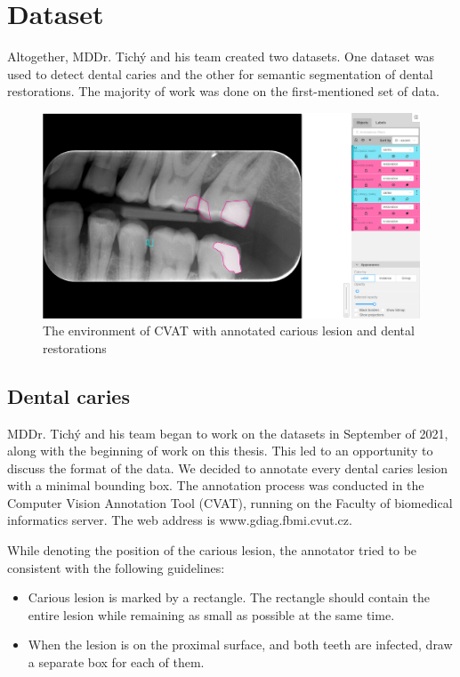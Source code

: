 \chapter{Dataset}
\label{chapter:dataset}
Altogether,  MDDr. Tichý and his team created two datasets. One dataset was used to detect dental caries and the other for semantic segmentation of dental restorations. The majority of work was done on the first-mentioned set of data.

\begin{figure}
    \centering
    \includegraphics[width=\linewidth]{images/cvat.png}
    \caption{The environment of CVAT with annotated carious lesion and dental restorations}
    \label{fig:cvat}
\end{figure}

\section{Dental caries}
MDDr. Tichý and his team began to work on the datasets in September of 2021, along with the beginning of work on this thesis. This led to an opportunity to discuss the format of the data. We decided to annotate every dental caries lesion with a minimal bounding box. The annotation process was conducted in the Computer Vision Annotation Tool (CVAT), running on the Faculty of biomedical informatics server. The web address is www.gdiag.fbmi.cvut.cz.

While denoting the position of the carious lesion, the annotator tried to be consistent with the following guidelines:

\begin{itemize}
    \item Carious lesion is marked by a rectangle. The rectangle should contain the entire lesion while remaining as small as possible at the same time.
    \item When the lesion is on the proximal surface, and both teeth are infected, draw a separate box for each of them.
\end{itemize}

